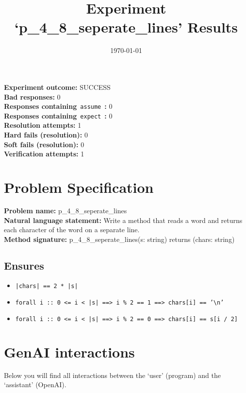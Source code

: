 \documentclass{article}
\begin{document}
\title{Experiment `p\_4\_8\_seperate\_lines' Results}
\author{\today}
\date{}
\maketitle
\textbf{Experiment outcome: }SUCCESS
\\\textbf{Bad responses: }0
\\\textbf{Responses containing}~\texttt{assume}~\textbf{: }0
\\\textbf{Responses containing}~\texttt{expect}~\textbf{: }0
\\\textbf{Resolution attempts: }1
\\\textbf{Hard fails (resolution): }0
\\\textbf{Soft fails (resolution): }0
\\\textbf{Verification attempts: }1
\section*{Problem Specification}
\textbf{Problem name: }p\_4\_8\_seperate\_lines
\\\textbf{Natural language statement: }Write a method that reads a word and returns each character of the word on a separate line.
\\\textbf{Method signature: }p\_4\_8\_seperate\_lines(s: string) returns (chars: string)
\subsection*{Ensures}
\begin{itemize}
\item \texttt{|chars| == 2 * |s|}
\item \texttt{forall i :: 0 <= i < |s| ==> i \% 2 == 1 ==> chars[i] == '\textbackslash{}n'}
\item \texttt{forall i :: 0 <= i < |s| ==> i \% 2 == 0 ==> chars[i] == s[i / 2]}
\end{itemize}
\clearpage
\section*{GenAI interactions}
Below you will find all interactions between the `user' (program) and the `assistant' (OpenAI).
\end{document}
